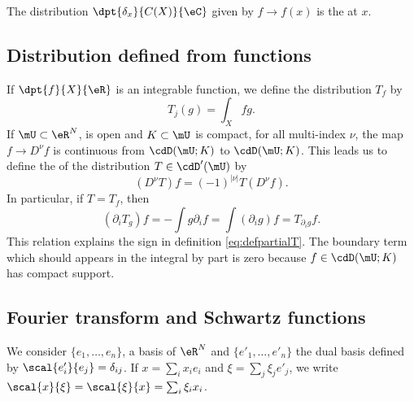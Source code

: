 The distribution $\dpt{\delta_x}{C(X)}{\eC}$ given by $f\to f(x)$ is the  at $x$.

\subsection{Distribution defined from functions}

If $\dpt{f}{X}{\eR}$ is an integrable function, we define the distribution $T_f$ by 
\[ 
  T_j(g)=\int_Xfg.
\]
If $\mU\subset\eR^N$, is open and $K\subset\mU$ is compact, for all multi-index $\nu$, the map $f\to D^{\nu}f$ is continuous from $\cdD(\mU;K)$ to $\cdD(\mU;K)$. This leads us to define the  of the distribution $T\in\cdD'(\mU)$ by
\begin{equation} \label{eq:defpartialT}
  (D^{\nu}T)f=(-1)^{| \nu |}T(D^{\nu}f).
\end{equation}
In particular, if $T=T_f$, then
\begin{equation} \label{eq:defTpri}
(\partial_iT_g)f=-\int g\partial_if
                =\int(\partial_ig)f
                =T_{\partial_ig}f.
\end{equation}
This relation explains the sign in definition \eqref{eq:defpartialT}. The boundary term which should appears in the integral by part is zero because $f\in\cdD(\mU;K)$ has compact support.

\subsection{Fourier transform and Schwartz functions}

We consider $\{ e_1,\ldots,e_n \}$, a basis of $\eR^N$ and $\{ e'_1,\ldots,e'_n \}$ the dual basis defined by $\scal{e'_i}{e_j}=\delta_{ij}$. If $x=\sum_ix_ie_i$ and $\xi=\sum_j\xi_je'_j$, we write $\scal{x}{\xi}=\scal{\xi}{x}=\sum_i\xi_ix_i$.

